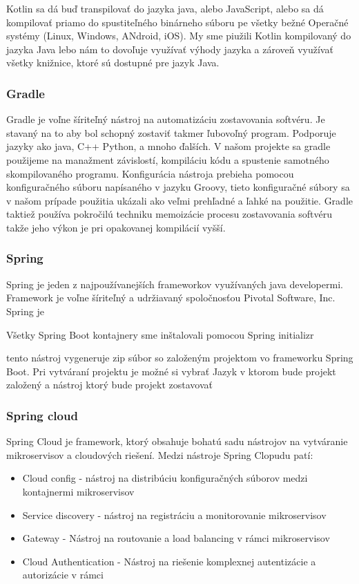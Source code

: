 Kotlin sa dá buď transpilovať do jazyka java, alebo JavaScript, alebo sa dá kompilovať priamo do spustiteľného  binárneho súboru pe všetky bežné Operačné systémy (Linux, Windows, ANdroid, iOS). 
My sme piužili Kotlin kompilovaný do jazyka Java lebo nám to dovoľuje využívať výhody jazyka a zároveň využívať všetky knižnice, ktoré sú dostupné pre jazyk Java. 

\subsubsection{Gradle}  
Gradle je voľne šíriteľný nástroj na automatizáciu zostavovania softvéru. Je stavaný na to aby bol schopný zostaviť takmer ľubovoľný program. Podporuje jazyky ako java, C++ Python, a mnoho ďalších. V našom projekte sa gradle použijeme na manažment závislostí, kompiláciu kódu a spustenie samotného skompilovaného programu. Konfigurácia nástroja prebieha pomocou konfiguračného súboru napísaného v jazyku Groovy, tieto konfiguračné  súbory sa v našom prípade použitia ukázali ako veľmi prehľadné a ľahké na použitie. Gradle taktiež používa pokročilú techniku memoizácie procesu zostavovania softvéru takže jeho výkon je pri opakovanej kompilácií vyšší. 


\subsubsection{Spring}  
Spring je jeden z najpoužívanejších frameworkov využívaných java developermi. Framework je voľne šíriteľný a udržiavaný spoločnosťou Pivotal Software, Inc.
Spring je 

Všetky Spring Boot kontajnery sme inštalovali pomocou Spring initializr \cite{initializr} 

tento nástroj vygeneruje zip súbor so založeným projektom vo frameworku Spring Boot. Pri vytváraní projektu je možné si vybrať Jazyk v ktorom bude projekt založený a nástroj ktorý bude projekt zostavovať %

\subsubsection{Spring cloud}  

Spring Cloud je framework, ktorý obsahuje bohatú sadu nástrojov na vytváranie mikroservisov a cloudových riešení. Medzi nástroje Spring Clopudu patí:   


\begin{itemize}  
	\item Cloud config - nástroj na distribúciu konfiguračných súborov medzi kontajnermi mikroservisov 
	\item Service discovery - nástroj na registráciu a monitorovanie mikroservisov  
	\item Gateway - Nástroj na routovanie a load balancing v rámci mikroservisov  	
	\item Cloud Authentication - Nástroj na riešenie komplexnej autentizácie a autorizácie v rámci  

\end{itemize}

